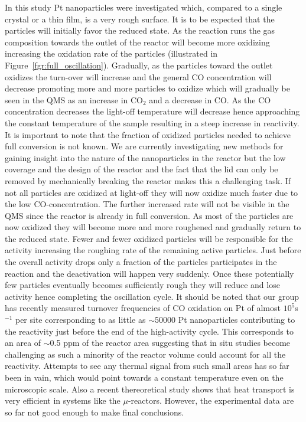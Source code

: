 \documentclass[8.5pt,twoside,twocolumn]{article}
\begin{document}
In this study Pt nanoparticles were investigated which, compared to a single crystal or a thin film, is a very rough surface. It is to be expected that the particles will initially favor the reduced state. As the reaction runs the gas composition towards the outlet of the reactor will become more oxidizing increasing the oxidation rate of the particles (illustrated in Figure~\ref{fgr:full_oscillation}). Gradually, as the particles toward the outlet oxidizes the turn-over will increase and the general CO concentration will decrease promoting more and more particles to oxidize which will gradually be seen in the QMS as an increase in CO$_2$ and a decrease in CO. As the CO concentration decreases the light-off temperature will decrease hence approaching the constant temperature of the sample resulting in a steep increase in reactivity. It is important to note that the fraction of oxidized particles needed to achieve full conversion is not known. We are currently investigating new methods for gaining insight into the nature of the nanoparticles in the reactor but the low coverage and the design of the reactor and the fact that the lid can only be removed by mechanically breaking the reactor makes this a challenging task. If not all particles are oxidized at light-off they will now oxidize much faster due to the low CO-concentration. The further increased rate will not be visible in the QMS since the reactor is already in full conversion. As most of the particles are now oxidized they will become more and more roughened and gradually return to the reduced state. Fewer and fewer oxidized particles will be responsible for the activity increasing the roughing rate of the remaining active particles. Just before the overall activity drops only a fraction of the particles participates in the reaction and the deactivation will happen very suddenly. Once these potentially few particles eventually becomes sufficiently rough they will reduce and lose activity hence completing the oscillation cycle. It should be noted that our group has recently measured turnover frequencies of CO oxidation on Pt of almost $10^{5}$s$^{-1}$ per site corresponding to as little as $\sim$50000 Pt nanoparticles contributing to the reactivity just before the end of the high-activity cycle. This corresponds to an area of $\sim$0.5 ppm of the reactor area suggesting that in situ studies become challenging as such a minority of the reactor volume could account for all the reactivity. Attempts to see any thermal signal from such small areas has so far been in vain, which would point towards a constant temperature even on the microscopic scale. Also a recent thereoretical study shows that heat transport is very efficient in systems like the $\mu$-reactors\cite{Zhdanov2012}. However, the experimental data are so far not good enough to make final conclusions.
\end{document}
